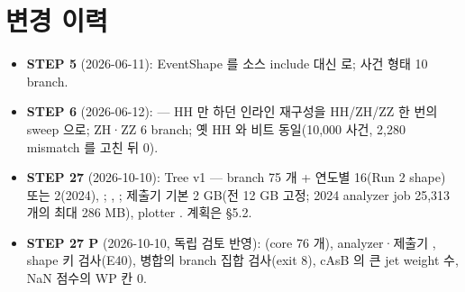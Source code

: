 \section{변경 이력}\label{sec:reco-history}
\begin{itemize}
\item \textbf{STEP 5} (2026-06-11): EventShape 를 소스 include 대신  로; 사건 형태 10 branch.
\item \textbf{STEP 6} (2026-06-12):  — HH 만 하던 인라인 재구성을 HH/ZH/ZZ 한 번의 sweep 으로; ZH·ZZ 6 branch;
      옛 HH 와 비트 동일(10,000 사건, 2,280 mismatch 를 고친 뒤 0).
\item \textbf{STEP 27} (2026-10-10): Tree v1 — branch 75 개 + 연도별 16(Run 2 shape) 또는 2(2024), ; ,
      ; 제출기  기본 2 GB(전 12 GB 고정; 2024 analyzer job 25,313 개의 최대 286 MB), plotter 
      . 계획은  §5.2.
\item \textbf{STEP 27 P} (2026-10-10, 독립 검토 반영): (core 76 개), analyzer·제출기 , shape 키 검사(E40),
      병합의 branch 집합 검사(exit 8), cAsB 의 큰 jet weight 수, NaN 점수의 WP 칸 0.
\end{itemize}

